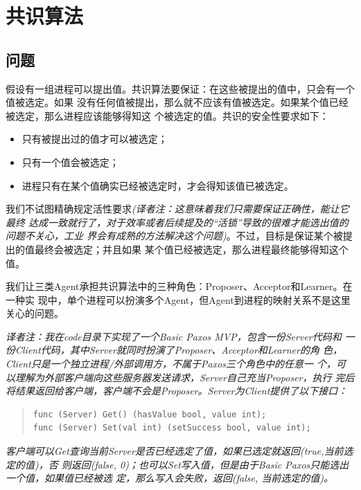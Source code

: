 \section{共识算法}

\subsection{问题}
假设有一组进程可以提出值。共识算法要保证：在这些被提出的值中，只会有一个值被选定。如果
没有任何值被提出，那么就不应该有值被选定。如果某个值已经被选定，那么进程应该能够得知这
个被选定的值。共识的安全性要求如下：

\begin{itemize}
\item 只有被提出过的值才可以被选定；
\item 只有一个值会被选定；
\item 进程只有在某个值确实已经被选定时，才会得知该值已被选定。
\end{itemize}

我们不试图精确规定活性要求\emph{(译者注：这意味着我们只需要保证正确性，能让它最终
达成一致就行了，对于效率或者后续提及的“活锁”导致的很难才能选出值的问题不关心，工业
界会有成熟的方法解决这个问题)}。不过，目标是保证某个被提出的值最终会被选定；并且如果
某个值已经被选定，那么进程最终能够得知这个值。

我们让三类Agent承担共识算法中的三种角色：Proposer、Acceptor和Learner。在一种实
现中，单个进程可以扮演多个Agent，但Agent到进程的映射关系不是这里关心的问题。

\emph{译者注：我在code目录下实现了一个Basic Paxos MVP，包含一份Server代码和
一份Client代码，其中Server就同时扮演了Proposer、Acceptor和Learner的角
色，Client只是一个独立进程/外部调用方，不属于Paxos三个角色中的任意一
个，可以理解为外部客户端向这些服务器发送请求，Server自己充当Proposer，执行
完后将结果返回给客户端，客户端不会是Proposer。Server为Client提供了以下接口：}

\begin{quote}
{\small
\begin{verbatim}
func (Server) Get() (hasValue bool, value int);
func (Server) Set(val int) (setSuccess bool, value int);
\end{verbatim}
}
\end{quote}

\emph{
客户端可以Get查询当前Server是否已经选定了值，如果已选定就返回(true,当前选定的值)，否
则返回(false, 0)；也可以Set写入值，但是由于Basic Paxos只能选出一个值，如果值已经被选
定，那么写入会失败，返回(false, 当前选定的值)。
}

